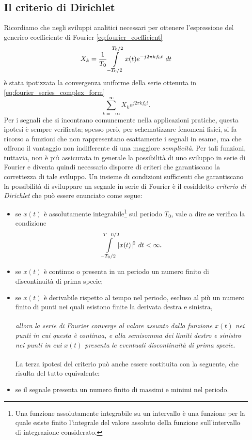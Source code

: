 \documentclass[12pt,oneside,openany]{memoir}
\numberwithin{equation}{subsection}
\DeclarePairedDelimiter{\abs}{\lvert}{\rvert}
\newcommand{\dt}{\ dt}
\begin{document}
\subsection{Il criterio di Dirichlet}
Ricordiamo che negli sviluppi analitici necessari per ottenere l'espressione del generico coefficiente di Fourier \eqref{eq:fourier_coefficient}
\begin{equation}
	X_k = \frac{1}{T_0} \int\displaylimits_{-T_0/2}^{T_0/2} x(t) e^{-j 2 \pi k f_0 t} \dt
\end{equation}
\`e stata ipotizzata la convergenza uniforme della serie ottenuta in \eqref{eq:fourier_series_complex_form}
\begin{equation}
	\sum_{k = -\infty}^{\infty} X_k e^{j 2 \pi k f_0 t}.
\end{equation}
Per i segnali che si incontrano comunemente nella applicazioni pratiche, questa ipotesi \`e sempre verificata; spesso per\`o, per schematizzare fenomeni fisici, si fa ricorso a funzioni che non rappresentano esattamente i segnali in esame, ma che offrono il vantaggio non indifferente di una maggiore \textit{semplicit\`a}. Per tali funzioni, tuttavia, non \`e pi\`u assicurata in generale la possibilit\`a di uno sviluppo in serie di Fourier e diventa quindi necessario disporre di criteri che garantiscano la correttezza di tale sviluppo.
\bigbreak
Un insieme di condizioni sufficienti che garantiscano la possibilit\`a di sviluppare un segnale in serie di Fourier \`e il cosiddetto \textit{criterio di Dirichlet} che pu\`o essere enunciato come segue:
\begin{itemize}
	\item se $x(t)$ \`e assolutamente integrabile\footnote{Una funzione assolutamente integrabile su un intervallo \`e una funzione per la quale esiste finito l'integrale del valore assoluto della funzione sull'intervallo di integrazione considerato.} sul periodo $T_0$, vale a dire se verifica la condizione
		\begin{equation}
			\int\displaylimits_{-T_0/2}^{T-0/2} \abs{x(t)}^2 \dt < \infty.
		\end{equation}
	\item se $x(t)$ \`e continuo o presenta in un periodo un numero finito di discontinuit\`a di prima specie;
	\item se $x(t)$ \`e derivabile rispetto al tempo nel periodo, escluso al pi\`u un numero finito di punti nei quali esistono finite la derivata destra e sinistra,\\
	\\
	\textit{allora la serie di Fourier converge al valore assunto dalla funzione $x(t)$ nei punti in cui questa \`e continua, e alla semisomma dei limiti destro e sinistro nei punti in cui $x(t)$ presenta le eventuali discontinuit\`a di prima specie.}\\
	\\	
	La terza ipotesi del criterio pu\`o anche essere sostituita con la seguente, che risulta del tutto equivalente:
	\item se il segnale presenta un numero finito di massimi e minimi nel periodo.
\end{itemize}
\end{document}
